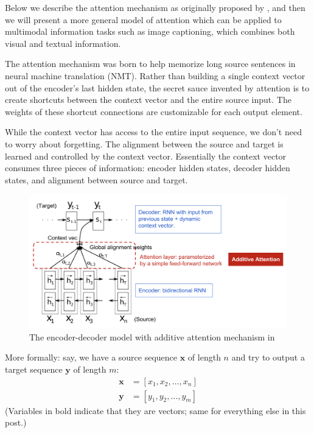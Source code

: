 Below we describe the attention mechanism as originally proposed by \citeauthor{Bahdanau2015}, and then we will present a more general model of attention which can be applied to multimodal information tasks such as image captioning, which combines both visual and textual information.

The attention mechanism was born to help memorize long source sentences in neural machine translation (NMT). Rather than building a single context vector out of the encoder’s last hidden state, the secret sauce invented by attention is to create shortcuts between the context vector and the entire source input. The weights of these shortcut connections are customizable for each output element.

While the context vector has access to the entire input sequence, we don’t need to worry about forgetting. The alignment between the source and target is learned and controlled by the context vector. Essentially the context vector consumes three pieces of information: encoder hidden states, decoder hidden states, and alignment between source and target.

\begin{figure}[hpt]
    \centering
    \includegraphics[scale=0.35]{images/ch3/bahdanau-attention.png}
    \caption{The encoder-decoder model with additive attention mechanism in \citep{Bahdanau2015}}
    \label{fig:bahdanau-attention}
\end{figure}

More formally: say, we have a source sequence $\mathbf{x}$ of length $n$ and try to output a target sequence $\mathbf{y}$ of length $m$:
$$
\begin{aligned}
\mathbf{x} &= [x_1, x_2, \dots, x_n] \\
\mathbf{y} &= [y_1, y_2, \dots, y_m]
\end{aligned}
$$
(Variables in bold indicate that they are vectors; same for everything else in this post.)

